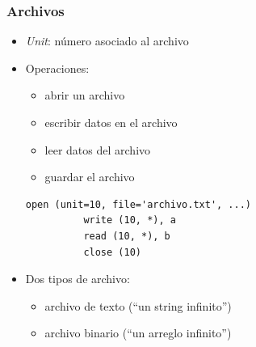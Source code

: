 \documentclass[12pt]{beamer}
\begin{document}
  \begin{frame}[fragile]
    \frametitle{Archivos}
    \begin{itemize}
      \item \emph{Unit}: número asociado al archivo
      \item Operaciones:
        \begin{itemize}
          \item abrir un archivo
          \item escribir datos en el archivo
          \item leer datos del archivo
          \item guardar el archivo
        \end{itemize}
        \pause
        \begin{lstlisting}[frame=single,gobble=6]
          open (unit=10, file='archivo.txt', ...)
          write (10, *), a
          read (10, *), b
          close (10)
        \end{lstlisting}
        \pause
      \item Dos tipos de archivo:
        \begin{itemize}
          \item archivo de texto (``un string infinito'')
          \item archivo binario (``un arreglo infinito'')
        \end{itemize}

    \end{itemize}
    
\end{frame}





\end{document}

